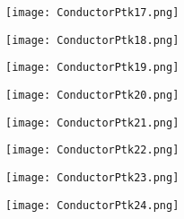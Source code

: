 \documentclass[pdf]{beamer}
\begin{document}
\begin{frame}
\begin{figure}[!h]
\centering
\texttt{[image: ConductorPtk17.png]}
\end{figure}
\end{frame}

\begin{frame}
\begin{figure}[!h]
\centering
\texttt{[image: ConductorPtk18.png]}
\end{figure}
\end{frame}

\begin{frame}
\begin{figure}[!h]
\centering
\texttt{[image: ConductorPtk19.png]}
\end{figure}
\end{frame}

\begin{frame}
\begin{figure}[!h]
\centering
\texttt{[image: ConductorPtk20.png]}
\end{figure}
\end{frame}

\begin{frame}
\begin{figure}[!h]
\centering
\texttt{[image: ConductorPtk21.png]}
\end{figure}
\end{frame}

\begin{frame}
\begin{figure}[!h]
\centering
\texttt{[image: ConductorPtk22.png]}
\end{figure}
\end{frame}

\begin{frame}
\begin{figure}[!h]
\centering
\texttt{[image: ConductorPtk23.png]}
\end{figure}
\end{frame}

\begin{frame}
\begin{figure}[!h]
\centering
\texttt{[image: ConductorPtk24.png]}
\end{figure}
\end{frame}
\end{document}

